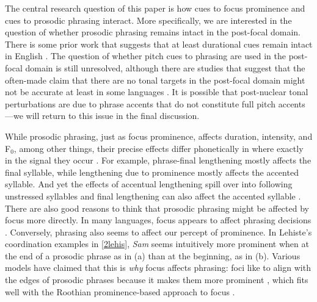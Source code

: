 \documentclass[preprint,review,12pt,authoryear,times]{elsarticle}
\begin{document}
The central research question of this paper is how cues to focus prominence and cues to prosodic phrasing interact. More specifically, we are interested in the question of whether prosodic phrasing remains intact in the post-focal domain.  There is some prior work that suggests that at least durational cues remain intact \citep{norcl05} in English \citep[see][for relevant results in other languages]{jun00, sugah03, ishih03, ishih16, kugle17}.  The question of whether pitch cues to phrasing are used in the post-focal domain is still unresolved, although  there are studies that suggest that the often-made claim that there are no tonal targets in the post-focal domain might not be accurate at least in some languages \citep{xu05,  kugle17}. It is possible that  post-nuclear tonal perturbations are due to phrase accents that do not constitute full pitch accents---we will return to this issue in the final discussion.

While prosodic phrasing, just as focus prominence, affects duration, intensity, and F$_0$, among other things, their precise effects differ phonetically in where exactly in the signal they occur \citep{edwar91, beckm92b, cho09, cho11}. For example, phrase-final lengthening mostly affects the final syllable, while lengthening due to prominence mostly affects the accented syllable. And yet the effects of accentual lengthening spill over into following unstressed syllables \citep{turk97} and final lengthening can also affect the accented syllable \citep{turk07}. There are also good reasons to think that prosodic phrasing might be affected by focus more directly. In many languages, focus appears to affect phrasing decisions \citep[][and references therein]{fery13}. Conversely, phrasing also seems to affect our percept of prominence. In Lehiste's coordination examples in \ref{2lehis}, {\em Sam} seems intuitively more prominent when at the end of a prosodic phrase as in (a) than at the beginning, as in (b). Various models have claimed that this is {\em why} focus affects phrasing: foci like to align with the edges of prosodic phrases because it makes them more prominent \citep{truck99,burin10typology}, which fits well with the Roothian prominence-based approach to focus \citep[but see][for a different perspective]{fery13}.  
\end{document}
